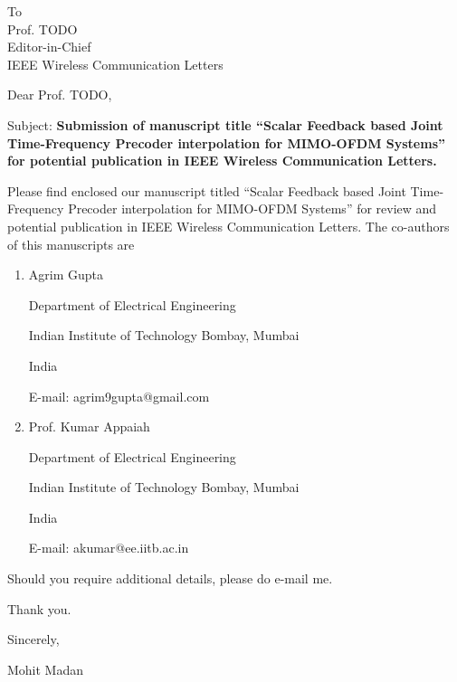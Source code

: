 \documentclass{letter}
\date{\today}
\begin{document}
\begin{letter}{To\\
Prof. TODO\\
Editor-in-Chief\\
IEEE Wireless Communication Letters}
\vspace{0.5in}


\opening{Dear Prof. TODO,} 

Subject: \textbf{Submission of manuscript title ``Scalar Feedback based Joint Time-Frequency Precoder
  interpolation for  MIMO-OFDM Systems'' for potential publication in
  IEEE Wireless Communication Letters.}

Please find enclosed our manuscript titled ``Scalar Feedback based Joint Time-Frequency Precoder
  interpolation for  MIMO-OFDM Systems'' for review and potential
  publication in IEEE Wireless Communication Letters. The co-authors of this manuscripts are
\begin{enumerate}
\item  Agrim Gupta

Department of Electrical  Engineering

Indian Institute of Technology Bombay, Mumbai

India

E-mail: agrim9gupta@gmail.com


\item Prof. Kumar Appaiah

Department of Electrical  Engineering

Indian Institute of Technology Bombay, Mumbai

India

E-mail: akumar@ee.iitb.ac.in

\end{enumerate}

Should you require additional details, please do e-mail me.

Thank you.
\vspace{0.3in}

Sincerely,

Mohit Madan

\end{letter}
\end{document}
